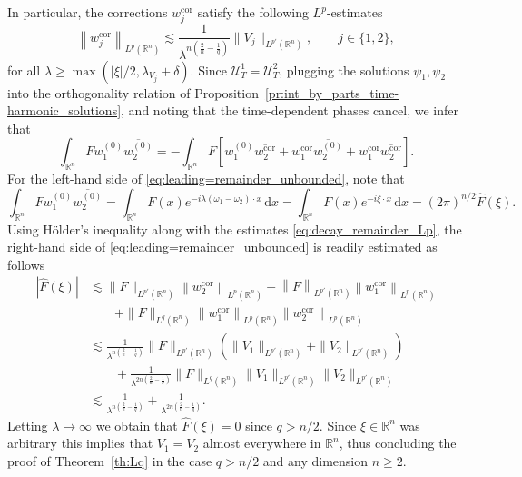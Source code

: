 \documentclass[11pt,a4paper]{amsart}
\theoremstyle{remark}
\theoremstyle{definition}
\newcommand{\R}{\mathbb{R}}
\newcommand{\dd}{\mathrm{d}}
\def\lec{\lesssim}
\def\wh{\widehat}
\def\ovl{\overline}
\begin{document}
In particular, the corrections $w^{\mathrm{cor}}_j$ satisfy the following $L^p$-estimates
\begin{equation}\label{eq:decay_remainder_Lp}
\left\| w^{\mathrm{cor}}_j \right\|_{L^p(\R^n)} \lesssim  \frac{1}{\lambda^{n(\frac{2}{n} - \frac{1}{q})}} \| V_j \|_{L^{p'} (\R^n)},\qquad j\in\{1,2\},
\end{equation}
for all $\lambda \geq \max(|\xi|/2, \lambda_{V_j} + \delta)$. Since $ \mathcal{U}^1_T=\mathcal{U}^2_T$, plugging the solutions $\psi_1,\psi_2$ into the orthogonality relation of Proposition~\ref{pr:int_by_parts_time-harmonic_solutions}, and noting that the time-dependent phases cancel, we infer that
\begin{equation}\label{eq:leading=remainder_unbounded}
\int_{\R^n} F w^{(0)}_1 \ovl{w^{(0)}_2}  = - \int_{\R^n} F \left[w^{(0)}_1 \ovl{w^{\mathrm{cor}}_2} + w^{\mathrm{cor}}_1 \ovl{w^{(0)}_2} + w^{\mathrm{cor}}_1 \ovl{w^{\mathrm{cor}}_2}\right].
\end{equation}
For the left-hand side of \eqref{eq:leading=remainder_unbounded}, note that  
\[
\int_{\R^n} F w^{(0)}_1 \ovl{w^{(0)}_2}  = \int_{\R^n} F(x) e^{-i \lambda( \omega_1-\omega_2)\cdot x}\,\dd x  = \int_{\R^n} F(x) e^{-i \xi \cdot x} \,\dd x = (2 \pi)^{n/2} \wh{F}(\xi).
\]
Using H\"older's inequality along with the estimates \eqref{eq:decay_remainder_Lp}, the right-hand side of \eqref{eq:leading=remainder_unbounded} is readily estimated as follows
\[
\begin{split}
|\wh{F}(\xi)| &\lesssim  \| F \|_{L^{p'}(\R^n)} \left\|w^{\mathrm{cor}}_2\right\|_{L^p(\R^n)} + \left\| F \right\|_{L^{p'}(\R^n)} \left\|w^{\mathrm{cor}}_1\right\|_{L^p(\R^n)} 
\\
&\qquad + \| F \|_{L^q(\R^n)} \left\| w^{\mathrm{cor}}_1 \right\|_{L^p(\R^n)} \left\| w^{\mathrm{cor}}_2 \right\|_{L^p(\R^n)} 
\\
&\lec \frac{1}{\lambda^{n(\frac{2}{n} - \frac{1}{q})}} \| F \|_{L^{p'}(\R^n)} \left(\| V_1 \|_{L^{p'}(\R^n)} +  \| V_2 \|_{L^{p'}(\R^n)} \right) 
\\
&\qquad + \frac{1}{\lambda^{2n(\frac{2}{n} - \frac{1}{q})}} \| F \|_{L^{q}(\R^n)}  \| V_1 \|_{L^{p'}(\R^n)} \| V_2 \|_{L^{p'}(\R^n)} \\
&\lec  \frac{1}{\lambda^{n(\frac{2}{n} - \frac{1}{q})}} + \frac{1}{\lambda^{2n(\frac{2}{n} - \frac{1}{q})}} .
\end{split}
\]
Letting $\lambda\to \infty $ we obtain that $\wh{F}(\xi) = 0$ since $q>n/2$. Since $\xi\in\R^n$ was arbitrary this implies that $V_1=V_2$ almost everywhere in $\R^n$, thus concluding the proof of Theorem~\ref{th:Lq} in the case $q>n/2$ and any dimension $n\geq 2$.
\end{document}

